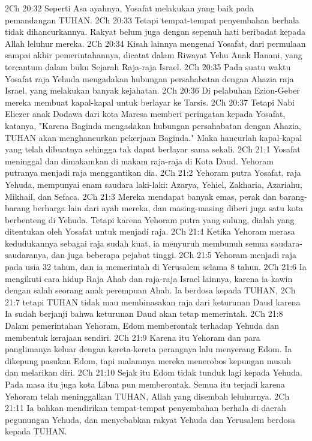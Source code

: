 2Ch 20:32  Seperti Asa ayahnya, Yosafat melakukan yang baik pada pemandangan TUHAN.
2Ch 20:33  Tetapi tempat-tempat penyembahan berhala tidak dihancurkannya. Rakyat belum juga dengan sepenuh hati beribadat kepada Allah leluhur mereka.
2Ch 20:34  Kisah lainnya mengenai Yosafat, dari permulaan sampai akhir pemerintahannya, dicatat dalam Riwayat Yehu Anak Hanani, yang tercantum dalam buku Sejarah Raja-raja Israel.
2Ch 20:35  Pada suatu waktu Yosafat raja Yehuda mengadakan hubungan persahabatan dengan Ahazia raja Israel, yang melakukan banyak kejahatan.
2Ch 20:36  Di pelabuhan Ezion-Geber mereka membuat kapal-kapal untuk berlayar ke Tarsis.
2Ch 20:37  Tetapi Nabi Eliezer anak Dodawa dari kota Maresa memberi peringatan kepada Yosafat, katanya, "Karena Baginda mengadakan hubungan persahabatan dengan Ahazia, TUHAN akan menghancurkan pekerjaan Baginda." Maka hancurlah kapal-kapal yang telah dibuatnya sehingga tak dapat berlayar sama sekali.
2Ch 21:1  Yosafat meninggal dan dimakamkan di makam raja-raja di Kota Daud. Yehoram putranya menjadi raja menggantikan dia.
2Ch 21:2  Yehoram putra Yosafat, raja Yehuda, mempunyai enam saudara laki-laki: Azarya, Yehiel, Zakharia, Azariahu, Mikhail, dan Sefaca.
2Ch 21:3  Mereka mendapat banyak emas, perak dan barang-barang berharga lain dari ayah mereka, dan masing-masing diberi juga satu kota berbenteng di Yehuda. Tetapi karena Yehoram putra yang sulung, dialah yang ditentukan oleh Yosafat untuk menjadi raja.
2Ch 21:4  Ketika Yehoram merasa kedudukannya sebagai raja sudah kuat, ia menyuruh membunuh semua saudara-saudaranya, dan juga beberapa pejabat tinggi.
2Ch 21:5  Yehoram menjadi raja pada usia 32 tahun, dan ia memerintah di Yerusalem selama 8 tahun.
2Ch 21:6  Ia mengikuti cara hidup Raja Ahab dan raja-raja Israel lainnya, karena ia kawin dengan salah seorang anak perempuan Ahab. Ia berdosa kepada TUHAN,
2Ch 21:7  tetapi TUHAN tidak mau membinasakan raja dari keturunan Daud karena Ia sudah berjanji bahwa keturunan Daud akan tetap memerintah.
2Ch 21:8  Dalam pemerintahan Yehoram, Edom memberontak terhadap Yehuda dan membentuk kerajaan sendiri.
2Ch 21:9  Karena itu Yehoram dan para panglimanya keluar dengan kereta-kereta perangnya lalu menyerang Edom. Ia dikepung pasukan Edom, tapi malamnya mereka menerobos kepungan musuh dan melarikan diri.
2Ch 21:10  Sejak itu Edom tidak tunduk lagi kepada Yehuda. Pada masa itu juga kota Libna pun memberontak. Semua itu terjadi karena Yehoram telah meninggalkan TUHAN, Allah yang disembah leluhurnya.
2Ch 21:11  Ia bahkan mendirikan tempat-tempat penyembahan berhala di daerah pegunungan Yehuda, dan menyebabkan rakyat Yehuda dan Yerusalem berdosa kepada TUHAN.
